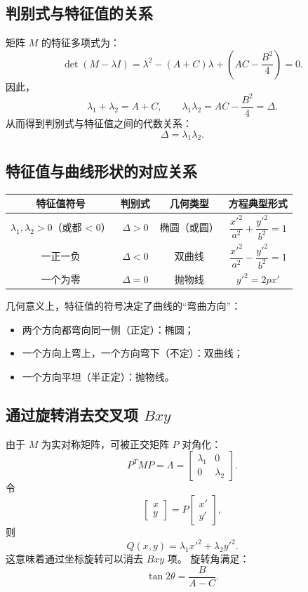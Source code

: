 \documentclass{article}
\begin{document}
\subsection{判别式与特征值的关系}

矩阵 \(M\) 的特征多项式为：
\[
\det(M - \lambda I)
= \lambda^2 - (A + C)\lambda + \left(AC - \frac{B^2}{4}\right) = 0.
\]
因此，
\[
\lambda_1 + \lambda_2 = A + C, \qquad
\lambda_1 \lambda_2 = AC - \frac{B^2}{4} = \Delta.
\]
从而得到判别式与特征值之间的代数关系：
\[
\boxed{\Delta = \lambda_1 \lambda_2.}
\]



\subsection{特征值与曲线形状的对应关系}

\begin{table}[h]
	\centering
	\begin{tabular}{|c|c|c|c|}
		\hline
		特征值符号 & 判别式 & 几何类型 & 方程典型形式 \\
		\hline
		\(\lambda_1, \lambda_2 > 0\)（或都 < 0） & \(\Delta > 0\) & 椭圆（或圆） & \(\dfrac{x'^2}{a^2} + \dfrac{y'^2}{b^2} = 1\) \\
		\hline
		一正一负 & \(\Delta < 0\) & 双曲线 & \(\dfrac{x'^2}{a^2} - \dfrac{y'^2}{b^2} = 1\) \\
		\hline
		一个为零 & \(\Delta = 0\) & 抛物线 & \(y'^2 = 2p x'\) \\
		\hline
	\end{tabular}
\end{table}

几何意义上，特征值的符号决定了曲线的“弯曲方向”：
\begin{itemize}
	\item 两个方向都弯向同一侧（正定）：椭圆；
	\item 一个方向上弯上，一个方向弯下（不定）：双曲线；
	\item 一个方向平坦（半正定）：抛物线。
\end{itemize}


\subsection{通过旋转消去交叉项 \(Bxy\)}

由于 \(M\) 为实对称矩阵，可被正交矩阵 \(P\) 对角化：
\[
P^T M P = \Lambda =
\begin{bmatrix}
	\lambda_1 & 0 \\ 0 & \lambda_2
\end{bmatrix}.
\]
令
\[
\begin{bmatrix}
	x \\ y
\end{bmatrix}
=
P
\begin{bmatrix}
	x' \\ y'
\end{bmatrix},
\]
则
\[
Q(x, y) = \lambda_1 x'^2 + \lambda_2 y'^2.
\]
这意味着通过坐标旋转可以消去 \(Bxy\) 项。  
旋转角满足：
\[
\tan 2\theta = \frac{B}{A - C}.
\]
\end{document}
